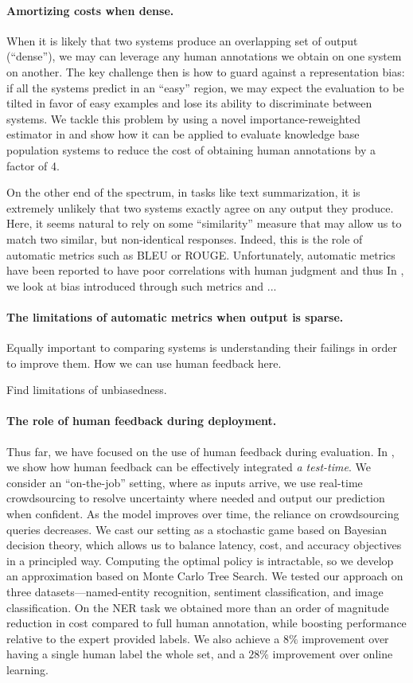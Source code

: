 \paragraph{Amortizing costs when dense.}
When it is likely that two systems produce an overlapping set of output (``dense''), we may can leverage any human annotations we obtain on one system on another.
The key challenge then is how to guard against a representation bias: if all the systems predict in an ``easy'' region, we may expect the evaluation to be tilted in favor of easy examples and lose its ability to discriminate between systems.
We tackle this problem by using a novel importance-reweighted estimator in  and show how it can be applied to evaluate knowledge base population systems to reduce the cost of obtaining human annotations by a factor of 4.

On the other end of the spectrum, in tasks like text summarization, it is extremely unlikely that two systems exactly agree on any output they produce.
Here, it seems natural to rely on some ``similarity'' measure that may allow us to match two similar, but non-identical responses.
Indeed, this is the role of automatic metrics such as BLEU or ROUGE.
Unfortunately, automatic metrics have been reported to have poor correlations with human judgment and thus 
In , we look at bias introduced through such metrics and ...

\paragraph{The limitations of automatic metrics when output is sparse.}
Equally important to comparing systems is understanding their failings in order to improve them.
How we can use human feedback here.

Find limitations of unbiasedness.


\paragraph{The role of human feedback during deployment.}
Thus far, we have focused on the use of human feedback during evaluation.
In , we show how human feedback can be effectively integrated \textit{a test-time}.
We consider an ``on-the-job'' setting, where as inputs arrive, we use real-time crowdsourcing to resolve uncertainty where needed and output our prediction when confident.
As the model improves over time, the reliance on crowdsourcing queries
decreases. 
We cast our setting as a stochastic game based on Bayesian decision
theory, which allows us to balance latency, cost, and accuracy objectives in a principled way. 
Computing the optimal policy is intractable, so we develop an approximation based on Monte Carlo Tree Search.
We tested our approach on three datasets---named-entity recognition, sentiment classification, and image classification.
On the NER task we obtained more than an order of magnitude reduction in cost compared to full human annotation, while boosting performance relative to the expert provided labels.
We also achieve a $8\%$ \fone{} improvement over having a single human label the whole set, and a $28\%$ \fone{} improvement over online learning.

